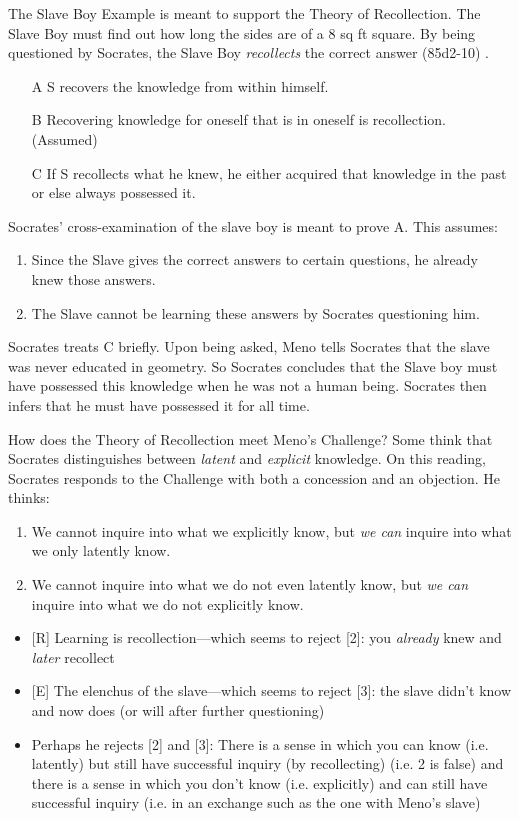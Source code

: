 \documentclass[10 pt]{article}
\begin{document}
The Slave Boy Example is meant to support the Theory of Recollection. The Slave Boy must find out how long the sides are of a 8 sq ft square. By being questioned by Socrates, the Slave Boy \emph{recollects} the correct answer (85d2-10) .

\begin{enumerate}
\item[A] S recovers the knowledge from within himself.
\item[B] Recovering knowledge for oneself that is in oneself is recollection. (Assumed)
\item[C] If S recollects what he knew, he either acquired that knowledge in the past or else always possessed it. 
\end{enumerate} 

Socrates' cross-examination of the slave boy is meant to prove A. This assumes:
\begin{enumerate}
\item Since the Slave gives the correct answers to certain questions, he already knew those answers. 
\item The Slave cannot be learning these answers by Socrates questioning him. 
\end{enumerate}
 
Socrates treats C briefly. Upon being asked, Meno tells Socrates that the slave was never educated in geometry. So Socrates concludes that the Slave boy must have possessed this knowledge when he was not a human being. Socrates then infers that he must have possessed it for all time. 

How does the Theory of Recollection meet Meno's Challenge? Some think that Socrates distinguishes between \emph{latent} and \emph{explicit} knowledge. On this reading, Socrates responds to the Challenge with both a concession and an objection. He thinks:
\begin{enumerate}
\item We cannot inquire into what we explicitly know, but \emph{we can} inquire into what we only latently know. 
\item We cannot inquire into what we do not even latently know, but \emph{we can} inquire into what we do not explicitly know.
\end{enumerate}

\begin{itemize}\item{[R] Learning is recollection---which seems to reject [2]: you \emph{already} knew and \emph{later} recollect}\item{[E] The elenchus of the slave---which seems to reject [3]: the slave didn't know and now does (or will after further questioning)}\item{Perhaps he rejects [2] and [3]: There is a sense in which you can know (i.e. latently) but still have successful inquiry (by recollecting) (i.e. 2 is false) and there is a sense in which you don't know (i.e. explicitly) and can still have successful inquiry (i.e. in an exchange such as the one with Meno's slave)}\end{itemize}
\end{document}
